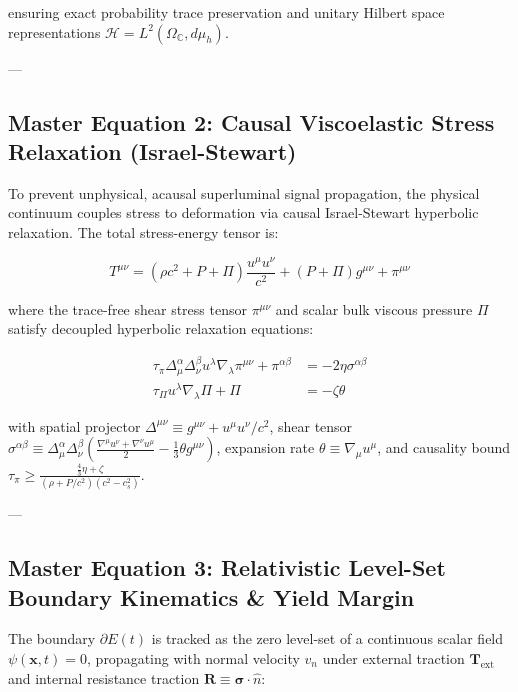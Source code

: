 \documentclass[11pt,a4paper]{article}
\theoremstyle{definition}
\theoremstyle{remark}
\begin{document}
ensuring exact probability trace preservation and unitary Hilbert space representations $\mathcal{H} = L^2(\Omega_{\mathbb{C}}, d\mu_h)$.

---

\subsection{Master Equation 2: Causal Viscoelastic Stress Relaxation (Israel-Stewart)}
To prevent unphysical, acausal superluminal signal propagation, the physical continuum couples stress to deformation via causal Israel-Stewart hyperbolic relaxation. The total stress-energy tensor is:


\begin{equation}
T^{\mu\nu} = \left(\rho c^2 + P + \Pi\right) \frac{u^\mu u^\nu}{c^2} + (P + \Pi) g^{\mu\nu} + \pi^{\mu\nu}
\end{equation}


where the trace-free shear stress tensor $\pi^{\mu\nu}$ and scalar bulk viscous pressure $\Pi$ satisfy decoupled hyperbolic relaxation equations:


\begin{equation}
\boxed{\begin{aligned}
\tau_\pi \Delta^\alpha_\mu \Delta^\beta_\nu u^\lambda \nabla_\lambda \pi^{\mu\nu} + \pi^{\alpha\beta} &= -2\eta \sigma^{\alpha\beta} \\[6pt]
\tau_\Pi u^\lambda \nabla_\lambda \Pi + \Pi &= -\zeta \theta
\end{aligned}}
\end{equation}

with spatial projector $\Delta^{\mu\nu} \equiv g^{\mu\nu} + u^\mu u^\nu/c^2$, shear tensor $\sigma^{\alpha\beta} \equiv \Delta^\alpha_\mu \Delta^\beta_\nu \left( \frac{\nabla^\mu u^\nu + \nabla^\nu u^\mu}{2} - \frac{1}{3}\theta g^{\mu\nu} \right)$, expansion rate $\theta \equiv \nabla_\mu u^\mu$, and causality bound $\tau_\pi \ge \frac{\frac{4}{3}\eta + \zeta}{(\rho + P/c^2)(c^2 - c_s^2)}$.

---

\subsection{Master Equation 3: Relativistic Level-Set Boundary Kinematics \& Yield Margin}
The boundary $\partial E(t)$ is tracked as the zero level-set of a continuous scalar field $\psi(\mathbf{x}, t) = 0$, propagating with normal velocity $v_n$ under external traction $\mathbf{T}_{\text{ext}}$ and internal resistance traction $\mathbf{R} \equiv \boldsymbol{\sigma} \cdot \hat{n}$:
\end{document}
